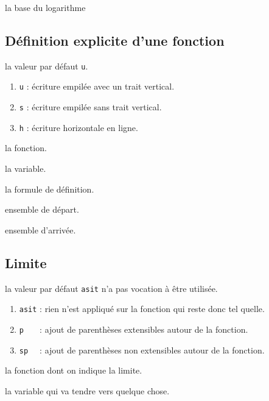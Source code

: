 \documentclass[12pt,a4paper]{article}
\theoremstyle{definition}
\begin{document}
\IDarg{} la base du logarithme





\subsection{Définition explicite d'une fonction}





\IDoption{}  la valeur par défaut \verb+u+. 
\begin{enumerate}
	\item \verb+u+ : écriture empilée avec un trait vertical.
	
	\item \verb+s+ : écriture empilée sans trait vertical.

	\item \verb+h+ : écriture horizontale en ligne.
\end{enumerate}


 la fonction.

 la variable.

 la formule de définition.

 ensemble de départ.

 ensemble d'arrivée.


\subsection{Limite}





\IDoption{}  la valeur par défaut \verb+asit+ n'a pas vocation à être utilisée. 
\begin{enumerate}
	\item \verb+asit+ : rien n'est appliqué sur la fonction qui reste donc tel quelle.
	
	\item \verb+p   + : ajout de parenthèses extensibles autour de la fonction.

	\item \verb+sp  + : ajout de parenthèses non extensibles autour de la fonction.
\end{enumerate}


 la fonction dont on indique la limite.

 la variable qui va tendre vers quelque chose.
\end{document}
